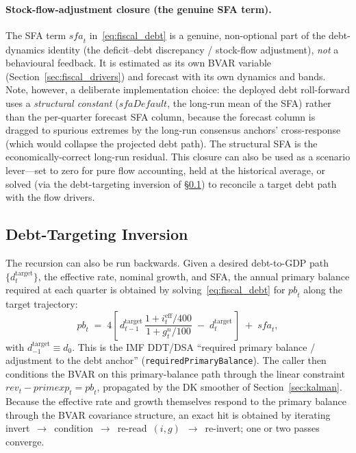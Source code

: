\documentclass[11pt]{article}
\theoremstyle{definition}
\theoremstyle{remark}
\begin{document}
\paragraph{Stock-flow-adjustment closure (the genuine SFA term).}  The
SFA term $\mathit{sfa}_t$ in~\eqref{eq:fiscal_debt} is a genuine,
non-optional part of the debt-dynamics identity (the deficit--debt
discrepancy / stock-flow adjustment), \emph{not} a behavioural feedback.
It is estimated as its own BVAR variable
(Section~\ref{sec:fiscal_drivers}) and forecast with its own dynamics and
bands.  Note, however, a deliberate implementation choice: the deployed
debt roll-forward uses a \emph{structural constant}
($\mathit{sfaDefault}$, the long-run mean of the SFA) rather than the
per-quarter forecast SFA column, because the forecast column is dragged
to spurious extremes by the long-run consensus anchors' cross-response
(which would collapse the projected debt path).  The structural SFA is
the economically-correct long-run residual.  This closure can also be
used as a scenario lever---set to zero for pure flow accounting, held at
the historical average, or solved (via the debt-targeting inversion of
\S\ref{sec:fiscal_inversion}) to reconcile a target debt path with the
flow drivers.

\subsection{Debt-Targeting Inversion}\label{sec:fiscal_inversion}

The recursion can also be run backwards.  Given a desired debt-to-GDP
path $\{d_t^{\text{target}}\}$, the effective rate, nominal growth, and
SFA, the annual primary balance required at each quarter is obtained by
solving~\eqref{eq:fiscal_debt} for $\mathit{pb}_t$ along the target
trajectory:
\begin{equation}\label{eq:fiscal_required_pb}
  \mathit{pb}_t \;=\; 4\left[\,
       d_{t-1}^{\text{target}}\,
       \frac{1 + i^{\text{eff}}_t/400}{1 + g^{n}_t/100}
       \;-\; d_t^{\text{target}} \,\right]
       \;+\; \mathit{sfa}_t ,
\end{equation}
with $d_{-1}^{\text{target}} \equiv d_0$.  This is the IMF DDT/DSA
``required primary balance / adjustment to the debt anchor''
(\texttt{requiredPrimaryBalance}).  The caller then conditions the BVAR
on this primary-balance path through the linear constraint
$\mathit{rev}_t - \mathit{primexp}_t = \mathit{pb}_t$, propagated by the
DK smoother of Section~\ref{sec:kalman}.  Because the effective rate and
growth themselves respond to the primary balance through the BVAR
covariance structure, an exact hit is obtained by iterating
invert~$\rightarrow$~condition~$\rightarrow$~re-read~$(i,g)$~$\rightarrow$~re-invert;
one or two passes converge.
\end{document}
